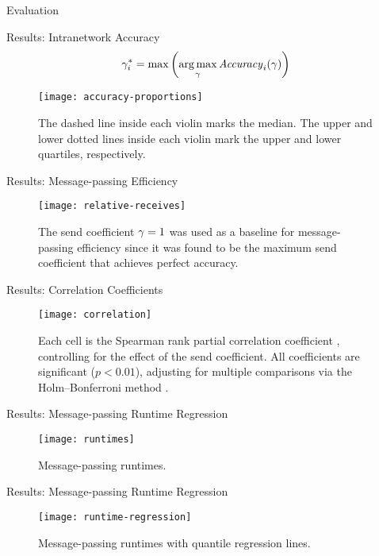 \documentclass[11pt]{beamer}
\begin{document}
\begin{section}{Evaluation}
\begin{frame}{Results: Intranetwork Accuracy}
\begin{equation*}
  \gamma_i^* = \max \left(\underset{\gamma}{\operatorname{\arg\max}} \, \mathit{Accuracy}_i(\gamma)\right)
\end{equation*}
\begin{figure}
  \centering
  \texttt{[image: accuracy-proportions]}
  \caption[Intranetwork accuracy distributions]{The dashed line inside each violin marks the median. The upper and lower dotted lines inside each violin mark the upper and lower quartiles, respectively.}
\end{figure}
\end{frame}

\begin{frame}{Results: Message-passing Efficiency}
\begin{figure}
  \centering
  \texttt{[image: relative-receives]}
  \caption[Message-passing efficiency]{The send coefficient $\gamma = 1$ was used as a baseline for message-passing efficiency since it was found to be the maximum send coefficient that achieves perfect accuracy.}
\end{figure}
\end{frame}

\begin{frame}{Results: Correlation Coefficients}
\begin{figure}
  \centering
  \texttt{[image: correlation]}
  \caption[Correlation matrix of dataset attributes]{Each cell is the Spearman rank partial correlation coefficient \citep{Spearman1904}, controlling for the effect of the send coefficient. All coefficients are significant ($p < 0.01$), adjusting for multiple comparisons via the Holm–Bonferroni method \citep{Holm1979}.}
\end{figure}
\end{frame}

\begin{frame}{Results: Message-passing Runtime Regression}
\begin{figure}
  \centering
  \texttt{[image: runtimes]}
  \caption[Message-passing runtimes]{Message-passing runtimes.}
\end{figure}
\end{frame}

\begin{frame}{Results: Message-passing Runtime Regression}
\begin{figure}
  \centering
  \texttt{[image: runtime-regression]}
  \caption[Message-passing runtimes with regression lines]{Message-passing runtimes with quantile regression lines.}
\end{figure}
\end{frame}

\end{section}
\end{document}
